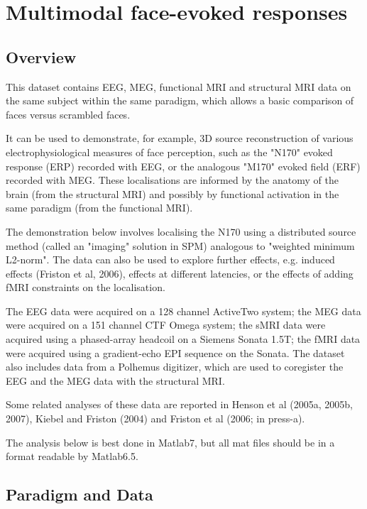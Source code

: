 \chapter{Multimodal face-evoked responses \label{Chap:data:multimodal}}


\section{Overview}

This dataset contains EEG, MEG, functional MRI and structural MRI data on the same subject within the same paradigm, which allows a basic comparison of faces versus scrambled faces.

It can be used to demonstrate, for example, 3D source reconstruction of various electrophysiological measures of face perception, such as the "N170" evoked response (ERP) recorded with EEG, or the analogous "M170" evoked field (ERF) recorded with MEG. These localisations are informed by the anatomy of the brain (from the structural MRI) and possibly by functional activation in the same paradigm (from the functional MRI).

The demonstration below involves localising the N170 using a distributed source method (called an "imaging" solution in SPM) analogous to "weighted minimum L2-norm". The data can also be used to explore further effects, e.g. induced effects (Friston et al, 2006), effects at different latencies, or the effects of adding fMRI constraints on the localisation.

The EEG data were acquired on a 128 channel ActiveTwo system; the MEG data were acquired on a 151 channel CTF Omega system; the sMRI data were acquired using a phased-array headcoil on a Siemens Sonata 1.5T; the fMRI data were acquired using a gradient-echo EPI sequence on the Sonata. The dataset also includes data from a Polhemus digitizer, which are used to coregister the EEG and the MEG data with the structural MRI.

Some related analyses of these data are reported in Henson et al (2005a, 2005b, 2007), Kiebel and Friston (2004) and Friston et al (2006; in press-a).

The analysis below is best done in Matlab7, but all mat files should be in a format readable by Matlab6.5.

\section{Paradigm and Data}

